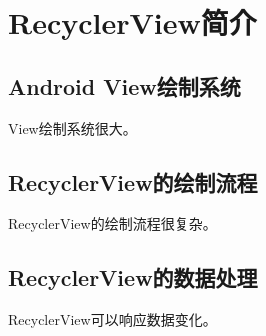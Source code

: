 \chapter{RecyclerView简介}
\section{Android View绘制系统}
View绘制系统很大。
\section{RecyclerView的绘制流程}
RecyclerView的绘制流程很复杂。
\section{RecyclerView的数据处理}
RecyclerView可以响应数据变化。